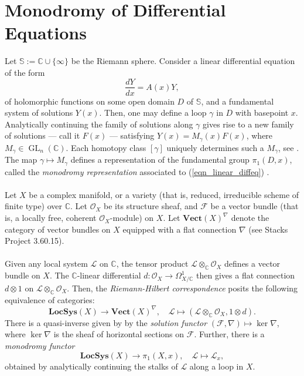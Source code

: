 \documentclass[a4paper]{report}
\theoremstyle{theorem}
\theoremstyle{definition}
\theoremstyle{remark}
\theoremstyle{proposition}
\theoremstyle{conjecture}
\theoremstyle{lemma}
\theoremstyle{corollary}
\theoremstyle{exercise}
\theoremstyle{example}
\newcommand{\C}{\mathbb{C}}
\newcommand{\mcal}{\mathcal}
\newcommand{\on}{\operatorname}
\begin{document}
   
  
  
  \appendix 
  
  \chapter{Monodromy of Differential Equations} 
  
  Let $\mathbb{S} := \C \cup \lbrace \infty\rbrace$ be the Riemann sphere.
  Consider a linear differential equation of the form 
  \begin{equation}\label{eqn_linear_diffeq}
      \frac{dY}{dx} = A(x)Y,
  \end{equation}
  of holomorphic functions on some open domain $D$ of $\mathbb{S}$,
  and a fundamental system of solutions $Y(x)$. Then, one may define a loop
  $\gamma$ in $D$ with basepoint $x$. Analytically continuing the family of solutions 
  along $\gamma$
  gives rise to a new family of solutions --- call it $F(x)$ --- 
  satisfying $Y(x) = M_\gamma(x)F(x)$, where $M_\gamma \in \on{GL}_n(\C)$.
  Each homotopy class $[\gamma]$ uniquely determines such a $M_\gamma$, see 
  \cite[Theorem 3.3]{hara20}.
  The map $\gamma \mapsto M_\gamma$ defines a representation of the fundamental group $\pi_1(D,x)$, called the \emph{monodromy
  representation} associated to (\ref{eqn_linear_diffeq}) \cite[Definition 5.1]{hara20}.\\\\
  Let $X$ be a complex manifold, or a variety (that is, reduced, irreducible scheme of finite type) over $\C$. Let
  $\mcal{O}_X$ be its structure sheaf, and $\mcal{F}$
  be a vector bundle (that is, a locally free, coherent $\mcal{O}_X$-module) 
  on $X$. 
  Let $\mathbf{Vect}(X)^\nabla$ denote the category of vector bundles
  on $X$ equipped with a flat connection $\nabla$ (see Stacks Project 3.60.15).\\\\ 
  Given any local system $\mcal{L}$ on $\C$, the tensor product $\mcal{L}\otimes_\C \mcal{O}_X$ defines a vector bundle on $X$. 
  The $\C$-linear differential $d : \mcal{O}_X \to \Omega_{X/\C}^1$ then gives a 
  flat connection $d\otimes 1$ on $\mcal{L} \otimes_\C \mcal{O}_X$. Then, the \emph{Riemann-Hilbert
  correspondence} posits the following equivalence of categories: 
  $$\mathbf{LocSys}(X) \longrightarrow \mathbf{Vect}(X)^\nabla, \quad \mcal{L} \longmapsto (\mcal{L} \otimes_\C \mcal{O}_X, 1\otimes d).$$
  There is a quasi-inverse given by by the \emph{solution functor}
  $(\mcal{F},\nabla) \mapsto \ker \nabla$, where 
  $\ker \nabla$ is the sheaf of horizontal sections on $\mcal{F}$.
  Further, there is a \emph{monodromy functor} 
  $$\mathbf{LocSys}(X) \longrightarrow \pi_1(X,x), \quad \mcal{L}\longmapsto \mcal{L}_x,$$
  obtained by analytically continuing the stalks of $\mcal{L}$ along a loop in $X$.
  
\end{document}
